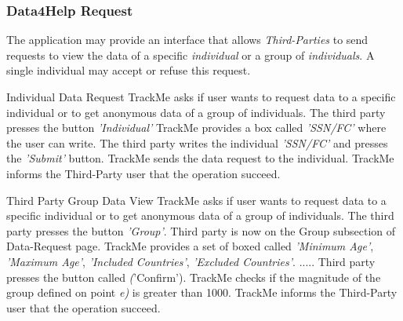 \documentclass[a4paper]{article}
\begin{document}
        \subsubsection{Data4Help Request}
        The application may provide an interface that allows \textit{Third-Parties} to send requests to view the data of a specific \textit{individual} or a group of \textit{individuals}. A single individual may accept or refuse this request.
        
        \begin{usecase}{Individual Data Request}
              {TrackMe asks if user wants to request data to a specific individual or to get anonymous data of a group of individuals.}
              {The third party presses the button \textit{'Individual'} }
              {TrackMe provides a box called \textit{'SSN/FC'} where the user can write.}
              {The third party writes the individual \textit{'SSN/FC'} and presses the \textit{'Submit'} button.}
              {TrackMe sends the data request to the individual.}
              {TrackMe informs the Third-Party user that the operation succeed.}
        \end{usecase}
        
        \begin{usecase}{Third Party Group Data View}
              {TrackMe asks if user wants to request data to a specific individual or to get anonymous data of a group of individuals.}
              {The third party presses the button \textit{'Group'}. Third party is now on the Group subsection of Data-Request page.}
              {TrackMe provides a set of boxed called \textit{'Minimum Age'}, \textit{'Maximum Age'}, \textit{'Included Countries'}, \textit{'Excluded Countries'}.}
              {.....}
              {Third party presses the button called \textit('Confirm').}
              {TrackMe checks if the magnitude of the group defined on point \textit{e)} is greater than 1000.}
              {TrackMe informs the Third-Party user that the operation succeed.}
        \end{usecase}
        
\end{document}
